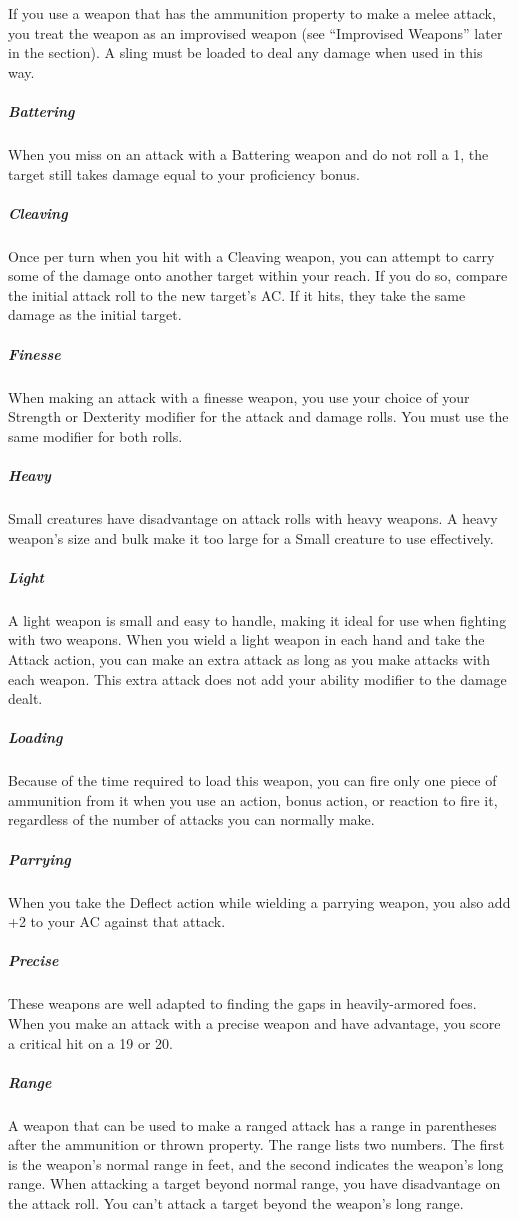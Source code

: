 If you use a weapon that has the ammunition property to make a melee attack, you treat the weapon as an improvised weapon (see “Improvised Weapons” later in the section). A sling must be loaded to deal any damage when used in this way.

\subparagraph*{Battering} When you miss on an attack with a Battering weapon and do not roll a 1, the target still takes damage equal to your proficiency bonus.

\subparagraph*{Cleaving} Once per turn when you hit with a Cleaving weapon, you can attempt to carry some of the damage onto another target within your reach. If you do so, compare the initial attack roll to the new target's AC. If it hits, they take the same damage as the initial target.

\subparagraph*{Finesse} When making an attack with a finesse weapon, you use your choice of your Strength or Dexterity modifier for the attack and damage rolls. You must use the same modifier for both rolls.

\subparagraph*{Heavy} Small creatures have disadvantage on attack rolls with heavy weapons. A heavy weapon's size and bulk make it too large for a Small creature to use effectively. 

\subparagraph*{Light} A light weapon is small and easy to handle, making it ideal for use when fighting with two weapons. When you wield a light weapon in each hand and take the Attack action, you can make an extra attack as long as you make attacks with each weapon. This extra attack does not add your ability modifier to the damage dealt.

\subparagraph*{Loading} Because of the time required to load this weapon, you can fire only one piece of ammunition from it when you use an action, bonus action, or reaction to fire it, regardless of the number of attacks you can normally make.

\subparagraph*{Parrying} When you take the Deflect action while wielding a parrying weapon, you also add +2 to your AC against that attack.

\subparagraph*{Precise} These weapons are well adapted to finding the gaps in heavily-armored foes. When you make an attack with a precise weapon and have advantage, you score a critical hit on a 19 or 20.

\subparagraph*{Range} A weapon that can be used to make a ranged attack has a range in parentheses after the ammunition or thrown property. The range lists two numbers. The first is the weapon's normal range in feet, and the second indicates the weapon's long range. When attacking a target beyond normal range, you have disadvantage on the attack roll. You can't attack a target beyond the weapon's long range.

